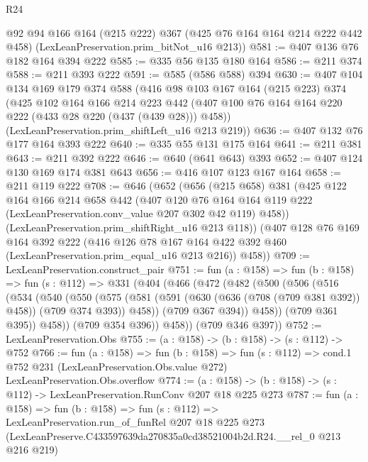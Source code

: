 \begin{lexlean}{R24}
\begin{coremodule}
      @92
      @94
      @166
      @164
      (@215 @222)
      @367
      (@425 @76 @164 @164 @214 @222 @442 @458)
      (LexLeanPreservation.prim_bitNot_u16 @213))
@581 := @407 @136 @76 @182 @164 @394 @222
@585 := @335 @56 @135 @180 @164
@586 := @211 @374
@588 := @211 @393 @222
@591 := @585 (@586 @588) @394
@630 := @407
    @104
    @134
    @169
    @179
    @374
    @588
    (@416
      @98
      @103
      @167
      @164
      (@215 @223)
      @374
      (@425
        @102
        @164
        @166
        @214
        @223
        @442
        (@407 @100 @76 @164 @164 @220 @222 (@433 @28 @220 (@437 (@439 @28))) @458))
      (LexLeanPreservation.prim_shiftLeft_u16 @213 @219))
@636 := @407 @132 @76 @177 @164 @393 @222
@640 := @335 @55 @131 @175 @164
@641 := @211 @381
@643 := @211 @392 @222
@646 := @640 (@641 @643) @393
@652 := @407 @124 @130 @169 @174 @381 @643
@656 := @416 @107 @123 @167 @164
@658 := @211 @119 @222
@708 := @646
    (@652
      (@656
        (@215 @658)
        @381
        (@425
          @122
          @164
          @166
          @214
          @658
          @442
          (@407
            @120
            @76
            @164
            @164
            @119
            @222
            (LexLeanPreservation.conv_value @207 @302 @42 @119)
            @458))
        (LexLeanPreservation.prim_shiftRight_u16 @213 @118))
      (@407
        @128
        @76
        @169
        @164
        @392
        @222
        (@416 @126 @78 @167 @164 @422 @392 @460 (LexLeanPreservation.prim_equal_u16 @213 @216))
        @458))
@709 := LexLeanPreservation.construct_pair
@751 := fun (a : @158) =>
  fun (b : @158) =>
  fun (s : @112) =>
  @331
    (@404
      (@466
        (@472
          (@482
            (@500
              (@506
                (@516
                  (@534
                    (@540
                      (@550
                        (@575
                          (@581
                            (@591 (@630 (@636 (@708 (@709 @381 @392)) @458)) (@709 @374 @393))
                            @458))
                        (@709 @367 @394))
                      @458))
                  (@709 @361 @395))
                @458))
            (@709 @354 @396))
          @458))
      (@709 @346 @397))
@752 := LexLeanPreservation.Obs
@755 := (a : @158) -> (b : @158) -> (s : @112) -> @752
@766 := fun (a : @158) =>
  fun (b : @158) =>
  fun (s : @112) =>
  cond.{1} @752 @231 (LexLeanPreservation.Obs.value @272) LexLeanPreservation.Obs.overflow
@774 := (a : @158) -> (b : @158) -> (s : @112) -> LexLeanPreservation.RunConv @207 @18 @225 @273
@787 := fun (a : @158) =>
  fun (b : @158) =>
  fun (s : @112) =>
  LexLeanPreservation.run_of_funRel
    @207
    @18
    @225
    @273
    (LexLeanPreserve.C433597639da270835a0cd38521004b2d.R24.__rel_0 @213 @216 @219)
\end{coremodule}
\end{lexlean}
